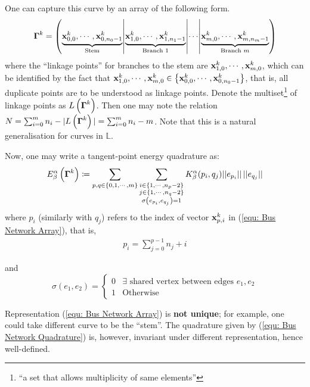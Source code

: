 \documentclass[../dissertation.tex]{subfiles}
\begin{document}
One can capture this curve by an array of the following form.
\begin{equation}
    \boldsymbol{\Gamma}^k = \left( \underbrace{\mathbf{x}_{0,0}^k, \cdots, \mathbf{x}_{0,n_0-1}^k}_{\text{Stem}} \middle|
    \underbrace{\mathbf{x}_{1,0}^k, \cdots, \mathbf{x}_{1,n_1-1}^k}_{\text{Branch 1}}
\middle| \cdots \middle|
\underbrace{\mathbf{x}_{m,0}^k, \cdots, \mathbf{x}_{m,n_m-1}^k}_{\text{Branch } m}\right)
\label{equ: Bus Network Array}
\end{equation}
where the ``linkage points'' for branches to the stem are $\mathbf{x}_{1,0}^k, \cdots, \mathbf{x}_{m,0}^k$,
which can be identified by the fact that $\mathbf{x}_{1,0}^k, \cdots, \mathbf{x}_{m,0}^k \in \left\{ \mathbf{x}_{0,0}^k, \cdots, \mathbf{x}_{0, n_0-1}^k \right\}$,
that is, all duplicate points are to be understood as linkage points.
Denote the multiset\footnote{``a set that allows multiplicity of same elements''} of linkage points as $L \left( \boldsymbol{\Gamma}^k \right)$.
Then one may note the relation $N = \sum_{i=0}^{m} n_{i} - |L\left( \boldsymbol{\Gamma}^k \right)| = \sum_{i=0}^m n_i - m$.
Note that this is a natural generalisation for curves in $\mathbb{L}$.

Now, one may write a tangent-point energy quadrature as:
\begin{equation}
    E_{\beta}^{\alpha} \left( \boldsymbol{\Gamma}^k \right) \coloneqq 
    \sum_{p, q \in \left\{ 0, 1, \cdots, m \right\}}
    \sum_{\substack{
            i \in \left\{ 1, \cdots, n_p - 2 \right\} \\
            j \in \left\{ 1, \cdots, n_q - 2 \right\} \\
            \sigma \left( e_{p_i}, e_{q_j} \right) = 1
    }}
    K_{\beta}^{\alpha} (p_i,q_j) \lvert \lvert e_{p_i} \rvert \rvert \, \lvert \lvert e_{q_j} \rvert \rvert
    \label{equ: Bus Network Quadrature}
\end{equation}
where $p_i$ (similarly with $q_j$) refers to the index of vector $\mathbf{x}_{p,i}^k$ in (\ref{equ: Bus Network Array}),
that is,
\begin{align*}
    p_i = \sum_{j=0}^{p-1} n_j + i
\end{align*}

and
\begin{equation*}
    \sigma \left( e_1, e_2 \right) =
    \begin{cases}
        0 & \exists \text{ shared vertex between edges } e_1, e_2 \\
        1 & \text{Otherwise}
    \end{cases}
\end{equation*}

\begin{remark}
    Representation (\ref{equ: Bus Network Array}) is \textbf{not unique}; for example, one could take different curve to be the ``stem''.
    The quadrature given by (\ref{equ: Bus Network Quadrature}) is, however, invariant under different representation, hence well-defined.
\end{remark}
\end{document}
